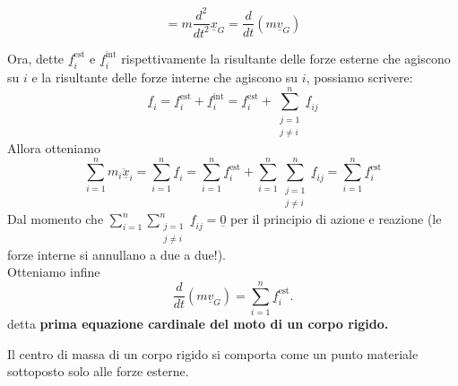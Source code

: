 \[
= m \frac{d^2}{dt^2} \underline{x}_G = \frac{d}{dt} \left( m \underline{v}_G \right)
\]

Ora, dette $\underline{f}_i^{\text{est}}$ e $\underline{f}_i^{\text{int}}$ rispettivamente la risultante delle forze esterne che agiscono su $i$ e la risultante delle forze interne che agiscono su $i$, possiamo scrivere:
\[
\underline{f}_i = \underline{f}_i^{\text{est}} + \underline{f}_i^{\text{int}} = \underline{f}_i^{\text{est}} + \sum_{\substack{j=1 \\ j \neq i}}^{n} \underline{f}_{ij}
\]
Allora otteniamo
\[
\sum_{i=1}^{n} m_i \underline{\ddot{x}}_i = \sum_{i=1}^{n} \underline{f}_i = \sum_{i=1}^{n} \underline{f}_i^{\text{est}} + \sum_{i=1}^{n} \sum_{\substack{j=1 \\ j \neq i}}^{n} \underline{f}_{ij} = \sum_{i=1}^{n} \underline{f}_i^{\text{est}}
\]
Dal momento che $\sum_{i=1}^{n} \sum_{\substack{j=1 \\ j \neq i}}^{n} \underline{f}_{ij} = \underline{0}$ per il principio di azione e reazione (le forze interne si annullano a due a due!).\\
Otteniamo infine
\[
\frac{d}{dt} \left( m \underline{v}_G \right) = \sum_{i=1}^{n} \underline{f}_i^{\text{est}}.
\]
detta \textbf{prima equazione cardinale del moto di un corpo rigido.}

\begin{oss}{}
Il centro di massa di un corpo rigido si comporta come un punto materiale sottoposto solo alle forze esterne.
\end{oss}


